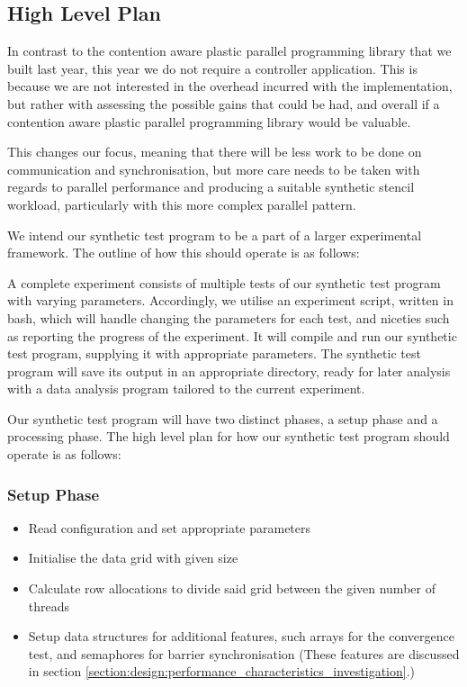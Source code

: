 \subsection{High Level Plan}
\label{section:implementation:high_level_plan}

In contrast to the contention aware plastic parallel programming library that we built last year, this year we do not require a controller application. This is because we are not interested in the overhead incurred with the implementation, but rather with assessing the possible gains that could be had, and overall if a contention aware plastic parallel programming library would be valuable.

This changes our focus, meaning that there will be less work to be done on communication and synchronisation, but more care needs to be taken with regards to parallel performance and producing a suitable synthetic stencil workload, particularly with this more complex parallel pattern.

We intend our synthetic test program to be a part of a larger experimental framework. The outline of how this should operate is as follows: 

A complete experiment consists of multiple tests of our synthetic test program with varying parameters. Accordingly, we utilise an experiment script, written in bash, which will handle changing the parameters for each test, and niceties such as reporting the progress of the experiment. It will compile and run our synthetic test program, supplying it with appropriate parameters. The synthetic test program will save its output in an appropriate directory, ready for later analysis with a data analysis program tailored to the current experiment. 

Our synthetic test program will have two distinct phases, a setup phase and a processing phase. The high level plan for how our synthetic test program should operate is as follows:



\subsubsection{Setup Phase}
\label{section:implementation:setup_phase}

\begin{itemize}
    \item Read configuration and set appropriate parameters
    \item Initialise the data grid with given size
    \item Calculate row allocations to divide said grid between the given number of threads
    \item Setup data structures for additional features, such arrays for the convergence test, and semaphores for barrier synchronisation (These features are discussed in section \ref{section:design:performance_characteristics_investigation}.)
\end{itemize}



